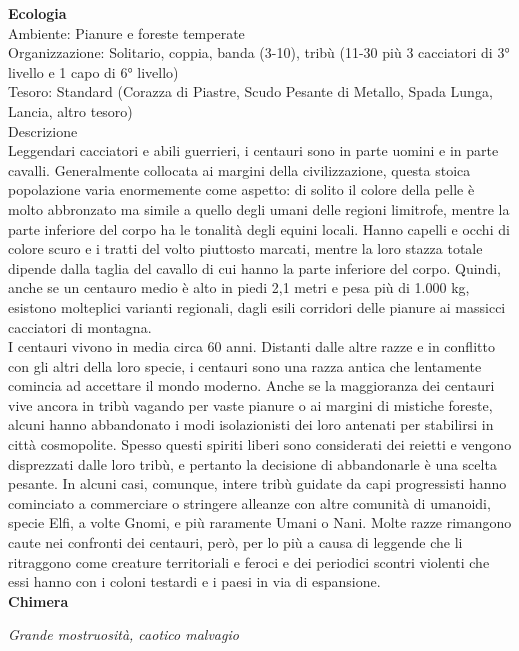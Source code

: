 \begin{multicols}{2}
\textbf{Ecologia}\\
Ambiente: Pianure e foreste temperate\\
Organizzazione: Solitario, coppia, banda (3-10), tribù (11-30 più 3 cacciatori di 3° livello e 1 capo di 6° livello)\\
Tesoro: Standard (Corazza di Piastre, Scudo Pesante di Metallo, Spada Lunga, Lancia, altro tesoro)\\
Descrizione\\
Leggendari cacciatori e abili guerrieri, i centauri sono in parte uomini e in parte cavalli. Generalmente collocata ai margini della civilizzazione, questa stoica popolazione varia enormemente come aspetto: di solito il colore della pelle è molto abbronzato ma simile a quello degli umani delle regioni limitrofe, mentre la parte inferiore del corpo ha le tonalità degli equini locali. Hanno capelli e occhi di colore scuro e i tratti del volto piuttosto marcati, mentre la loro stazza totale dipende dalla taglia del cavallo di cui hanno la parte inferiore del corpo. Quindi, anche se un centauro medio è alto in piedi 2,1 metri e pesa più di 1.000 kg, esistono molteplici varianti regionali, dagli esili corridori delle pianure ai massicci cacciatori di montagna.\\
I centauri vivono in media circa 60 anni. Distanti dalle altre razze e in conflitto con gli altri della loro specie, i centauri sono una razza antica che lentamente comincia ad accettare il mondo moderno. Anche se la maggioranza dei centauri vive ancora in tribù vagando per vaste pianure o ai margini di mistiche foreste, alcuni hanno abbandonato i modi isolazionisti dei loro antenati per stabilirsi in città cosmopolite. Spesso questi spiriti liberi sono considerati dei reietti e vengono disprezzati dalle loro tribù, e pertanto la decisione di abbandonarle è una scelta pesante. In alcuni casi, comunque, intere tribù guidate da capi progressisti hanno cominciato a commerciare o stringere alleanze con altre comunità di umanoidi, specie Elfi, a volte Gnomi, e più raramente Umani o Nani. Molte razze rimangono caute nei confronti dei centauri, però, per lo più a causa di leggende che li ritraggono come creature territoriali e feroci e dei periodici scontri violenti che essi hanno con i coloni testardi e i paesi in via di espansione.\\


\medskip{}\textbf{Chimera}

\emph{Grande mostruosità, caotico malvagio}


\end{multicols}
